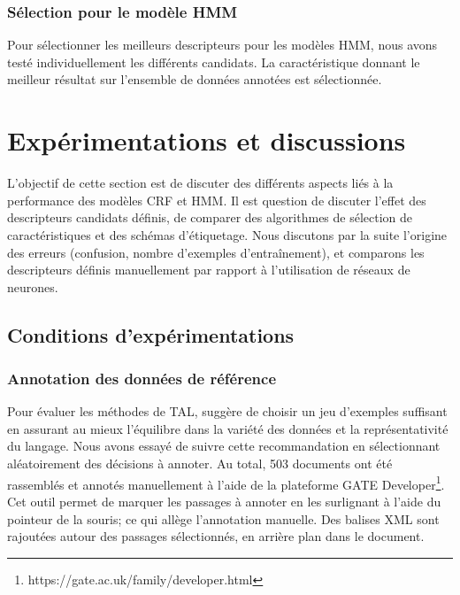 \subsubsection{Sélection pour le modèle HMM} Pour sélectionner les meilleurs descripteurs pour les modèles HMM, nous avons testé individuellement les différents candidats. La caractéristique donnant le meilleur résultat sur l'ensemble de données annotées est sélectionnée.

\section{Expérimentations et discussions}

L'objectif de cette section est de discuter des différents aspects liés à la performance des modèles CRF et HMM. Il est question de discuter l'effet des descripteurs candidats définis, de comparer des algorithmes de sélection de caractéristiques et des schémas d'étiquetage. Nous discutons par la suite l'origine des erreurs (confusion, nombre d'exemples d'entraînement), et comparons les descripteurs définis manuellement par rapport à l'utilisation de réseaux de neurones.

\label{sec:structuration:experimentations}
\subsection{Conditions d'expérimentations}
\subsubsection{Annotation des données de référence}
Pour évaluer les méthodes de TAL, \citet{xiao2010corpuscreation} suggère de choisir un jeu d'exemples suffisant en assurant au mieux l'équilibre dans la variété des données et la représentativité du langage. Nous avons essayé de suivre cette recommandation  en sélectionnant aléatoirement des décisions à annoter. Au total, 503 documents ont été rassemblés et annotés manuellement à l'aide de la plateforme GATE Developer\footnote{https://gate.ac.uk/family/developer.html}. Cet outil permet de marquer les passages à annoter en les surlignant à l'aide du pointeur de la souris; ce qui allège  l'annotation manuelle. Des balises XML sont rajoutées autour des passages sélectionnés, en arrière plan dans le document.

